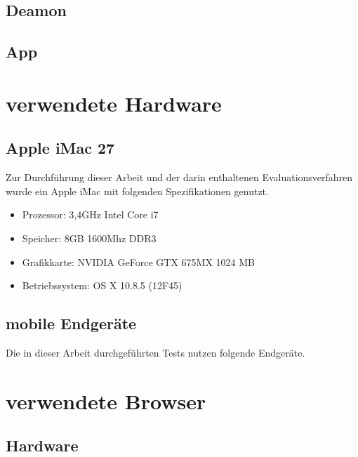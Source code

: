 		\subsection{Deamon}
		\subsection{App}
	
	\section{verwendete Hardware}
	
	\subsection{Apple iMac 27\texttt\dq}
	Zur Durchführung dieser Arbeit und der darin enthaltenen Evaluationsverfahren wurde ein Apple iMac mit folgenden 				Spezifikationen genutzt.
	\begin{itemize} 
		\item Prozessor: 3,4GHz Intel Core i7 
		\item Speicher: 8GB 1600Mhz DDR3
		\item Grafikkarte: NVIDIA GeForce GTX 675MX 1024 MB
		\item Betriebssystem: OS X 10.8.5 (12F45)
	\end{itemize}
	
	\pagebreak
	\subsection{mobile Endgeräte}
	Die in dieser Arbeit durchgeführten Tests nutzen folgende Endgeräte. 
	
	
	\pagebreak
	\section{verwendete Browser}
		\subsection{}
		\subsection{Hardware}
